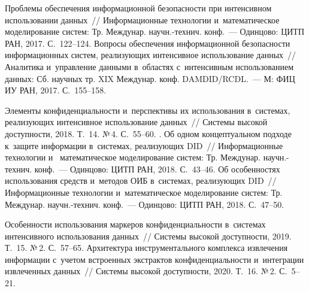 \begin{multicols}{2}
{\small\frenchspacing
{%
\begin{thebibliography}{99}

 Проб\-ле\-мы обеспечения 
информационной безопас\-ности при интенсивном использовании данных~// 
Информационные технологии и~математическое моделирование сис\-тем: Тр. 
Междунар. 
на\-учн.-тех\-нич. конф.~--- Одинцово: ЦИТП РАН, 2017. С.~122--124.
 Вопросы 
обеспечения информационной безопас\-ности информационных систем, реализующих 
интенсивное использование данных~//\linebreak Аналитика и~управ\-ле\-ние данными в~областях 
с~интенсивным использованием данных: Сб. научных тр. XIX Междунар. конф. 
DAMDID/RCDL.~--- М: ФИЦ ИУ РАН, 2017. С.~155--158.
  

 Элементы конфиденциальности и~перспективы их использования  
в~сис\-те\-мах, реализующих интенсивное использование данных~// Сис\-те\-мы высокой 
до\-ступ\-ности, 2018. Т.~14. №\,4. С.~55--60.
. Об одном концептуальном подходе к~защите информации 
в~сис\-те\-мах, реализующих DID~// Информационные технологии и~
математическое моделирование сис\-тем: Тр. Междунар. на\-учн.-тех\-нич. конф.~--- 
Одинцово: ЦИТП РАН, 2018. С.~43--46.
 Об особенностях использования средств и~методов ОИБ в~сис\-те\-мах, реализующих DID~// Информационные технологии 
и~математическое моделирование сис\-тем: Тр. Междунар. на\-учн.-тех\-нич. конф.~--- 
Одинцово: ЦИТП РАН, 2018. С.~47--50.

 Особенности использования 
маркеров конфиден\-ци\-аль\-ности в~системах интенсивного использования данных~// 
Сис\-те\-мы высокой до\-ступ\-ности, 2019. Т.~15. №\,2. С.~57--65.
 Архитектура инструментального 
комплекса извлечения информации с~учетом встроенных экстрактов конфиденциальности и~интеграции извлеченных данных~// Сис\-те\-мы высокой до\-ступ\-ности, 2020. Т.~16. 
№\,2. С.~5--21.


\end{thebibliography}}}
\end{multicols}
